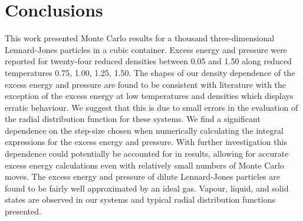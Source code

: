 \documentclass[10pt, twocolumn]{revtex4}    %
\begin{document}
\section{Conclusions} \label{s:conclusions}
This work presented Monte Carlo results for a thousand three-dimensional Lennard-Jones particles in a cubic container. Excess energy and pressure were reported for twenty-four reduced densities between \num{0.05} and \num{1.50} along reduced temperatures \num{0.75}, \num{1.00}, \num{1.25}, \num{1.50}. The shapes of our density dependence of the excess energy and pressure are found to be consistent with literature with the exception of the excess energy at low temperatures and densities which displays erratic behaviour. We suggest that this is due to small errors in the evaluation of the radial distribution function for these systems. We find a significant dependence on the step-size chosen when numerically calculating the integral expressions for the excess energy and pressure. With further investigation this dependence could potentially be accounted for in results, allowing for accurate excess energy calculations even with relatively small numbers of Monte Carlo moves. The excess energy and pressure of dilute Lennard-Jones particles are found to be fairly well approximated by an ideal gas. Vapour, liquid, and solid states are observed in our systems and typical radial distribution functions presented.
\end{document}
